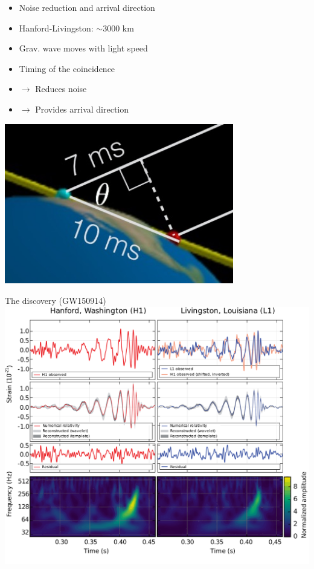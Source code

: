 \Tr
{}%
\begin{itemize}
\item[] \begin{center}{\blue Noise reduction and arrival direction}\end{center}
\item Hanford-Livingston: $\sim$3000 km
\item Grav. wave moves with light speed
\item Timing of the  coincidence
\item[] $\rightarrow$ Reduces noise
\item[] $\rightarrow$ Provides arrival direction
\end{itemize}
%
\begin{center}
\includegraphics[keepaspectratio,width=10cm]{ligo-dt}
\end{center}

\newpage
%
\begin{center}
{\blue The discovery (GW150914)}\\[3mm]
\includegraphics[keepaspectratio,width=15cm]{GW150914}
\end{center}

